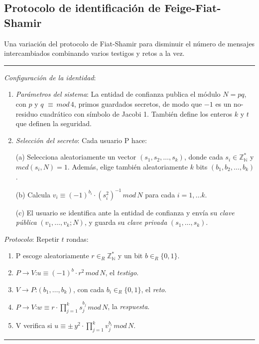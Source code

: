 \subsection{Protocolo de identificación de Feige-Fiat-Shamir}


Una variación del protocolo de Fiat-Shamir para disminuir el número de mensajes intercambiados combinando varios testigos y retos a la vez.

\rule{\textwidth}{1pt}
\begin{algorithm}
	\hfil
	
	\textit{Configuración de la identidad}:
	\begin{enumerate}
		\item \textit{Parámetros del sistema}: La entidad de confianza publica el módulo $N=pq$, con $p$ y $q$ $\equiv \, mod \, 4$, primos guardados secretos, de modo que $-1$ es un no-residuo cuadrático con símbolo de Jacobi 1. También define los enteros $k$ y $t$ que definen la seguridad.
		
		\item \textit{Selección del secreto}: Cada usuario P hace:
		
		\subitem (a) Selecciona aleatoriamente un vector $(s_1,s_2,\dots ,s_k)$, donde cada  $s_i \in \mathbb{Z_N^*}$ y $mcd(s_i, N)=1$. Además, elige también aleatoriamente $k$ bits $(b_1, b_2, \dots , b_k)$.
		
		\subitem (b) Calcula $v_i \equiv (-1)^{b_i}\cdot (s_i^2)^{-1} \, mod \, N$ para cada $i=1,\dots k$.
		
		\subitem (c) El usuario se identifica ante la entidad de confianza y envía su \textit{clave pública} $(v_1,\dots , v_k; N)$, y guarda su \textit{clave privada} $(s_1, \dots , s_k)$.
		
	\end{enumerate}
	
	
	\textit{Protocolo}: Repetir $t$ rondas:
	\begin{enumerate}
		\item P escoge aleatoriamente $r \in_R \mathbb{Z_N^*}$ y un bit $b \in_R \{0,1\}$.
		\item $P \rightarrow V$:\quad $u \equiv (-1)^b \cdot r^2 \, mod \, N$, el \textit{testigo}.
		\item $V \rightarrow P$:\quad $(b_1,\dots ,b_k)$, con cada $b_i \in_R \{0,1\}$, el \textit{reto}.
		\item $P \rightarrow V$:\quad $w \equiv r\cdot \prod_{j=1}^{k} s_j^{b_j} \, mod \, N$, la \textit{respuesta}.
		\item V verifica si \quad $ u \equiv \pm \, y^2 \cdot \prod_{j=1}^{k} v_j^{b_i} \, mod \, N$.
	\end{enumerate}
	
\end{algorithm}
\rule{\textwidth}{1pt}

